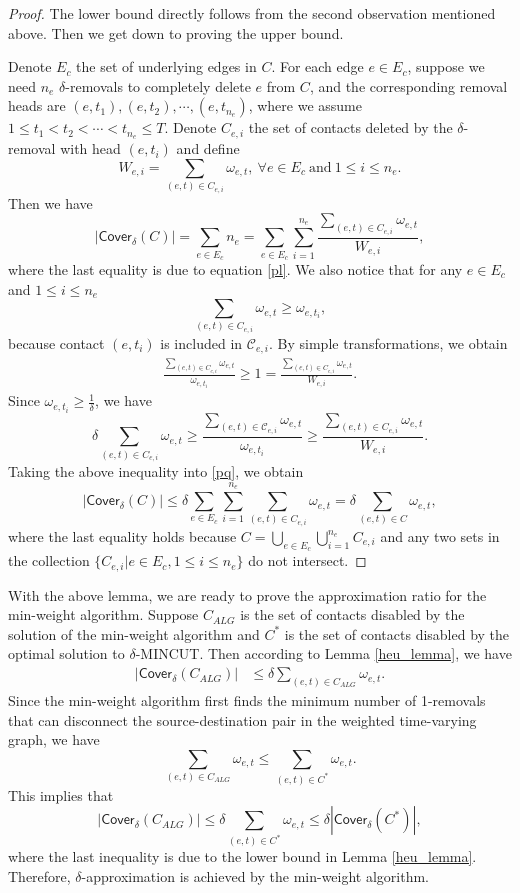 \documentclass[10pt, conference, letterpaper]{IEEEtran}
\begin{document}
\begin{proof}
The lower bound directly follows from the second observation mentioned above. Then we get down to proving the upper bound.

Denote $E_c$ the set of underlying edges in $C$. For each edge $e\in E_c$, suppose we need $n_e$ $\delta$-removals to completely delete $e$ from $C$, and the corresponding removal heads are $(e,t_1),(e,t_2),\cdots,(e,t_{n_e})$, where we assume $1\le t_1<t_2<\cdots<t_{n_e}\le T$. Denote $C_{e,i}$ the set of contacts deleted by the $\delta$-removal with head $(e,t_i)$ and define
\begin{equation}\label{pl}
W_{e,i}=\sum_{(e,t)\in C_{e,i}}\omega_{e,t},~\forall e\in E_c~\text{and}~1\le i\le n_e.
\end{equation}
Then we have
\begin{equation}\label{pq}
|\mathsf{Cover_{\delta}}(C)|=\sum_{e\in E_c}n_e=\sum_{e\in E_c}\sum_{i=1}^{n_e}\frac{\sum_{(e,t)\in C_{e,i}}\omega_{e,t}}{W_{e,i}},
\end{equation}
where the last equality is due to equation \eqref{pl}. We also notice that for any $e\in E_c$ and $1\le i\le n_e$
\[
\sum_{(e,t)\in C_{e,i}}\omega_{e,t}\ge \omega_{e,t_i},
\]
because contact $(e,t_i)$ is included in $\mathcal{C}_{e,i}$. By simple transformations, we obtain
\[
\begin{split}
\frac{\sum_{(e,t)\in C_{e,i}}\omega_{e,t}}{\omega_{e,t_i}}\ge 1=\frac{\sum_{ (e,t)\in C_{e,i}}\omega_{e,t}}{W_{e,i}}.
\end{split}
\]
Since $\omega_{e,t_i}\ge \frac{1}{\delta}$, we have
\[
\delta \sum_{(e,t)\in C_{e,i}}\omega_{e,t}\ge \frac{\sum_{(e,t)\in \mathcal{C}_{e,i}}\omega_{e,t}}{\omega_{e,t_i}} \ge \frac{\sum_{(e,t)\in C_{e,i}}\omega_{e,t}}{W_{e,i}}.
\]
Taking the above inequality into \eqref{pq}, we obtain
\[
|\mathsf{Cover_{\delta}}(C)|\le \delta \sum_{e\in E_c}\sum_{i=1}^{n_e}\sum_{(e,t)\in C_{e,i}}\omega_{e,t}=\delta\sum_{(e,t)\in C}\omega_{e,t},
\]
where the last equality holds because $C=\bigcup_{e\in E_c}\bigcup_{i=1}^{n_e}C_{e,i}$ and any two sets in the collection $\{C_{e,i}|e\in E_c, 1\le i\le n_e\}$ do not intersect.
\end{proof}

With the above lemma, we are ready to prove the approximation ratio for the min-weight algorithm. Suppose $C_{ALG}$ is the set of contacts disabled by the solution of the min-weight algorithm and $C^*$ is the set of contacts disabled by the optimal solution to $\delta$-MINCUT. Then according to Lemma \ref{heu_lemma}, we have
\[
\begin{split}
|\mathsf{Cover_{\delta}}(C_{ALG})|&\le \delta\sum_{(e,t)\in {C_{ALG}}}\omega_{e,t}.
\end{split}
\]
Since the min-weight algorithm first finds the minimum number of 1-removals that can disconnect the source-destination pair in the weighted time-varying graph, we have
\[
\sum_{(e,t)\in C_{ALG}}\omega_{e,t}\le  \sum_{(e,t)\in C^*}\omega_{e,t}.
\]
This implies that
\[
|\mathsf{Cover_{\delta}}(C_{ALG})| \le \delta \sum_{(e,t)\in C^*}\omega_{e,t}\le \delta|\mathsf{Cover_{\delta}}(C^*)|,
\]
where the last inequality is due to the lower bound in Lemma \ref{heu_lemma}. Therefore, $\delta$-approximation is achieved by the min-weight algorithm.
\end{document}
